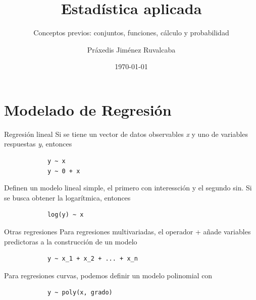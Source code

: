 \documentclass[aspectratio=169,xcolor=dvipsnames]{beamer}
\title{Estadística aplicada}
\subtitle{Conceptos previos: conjuntos, funciones, cálculo y probabilidad}
\author{Práxedis Jiménez Ruvalcaba}
\institute
{

}
\date{\today}
\begin{document}
\begin{frame}[c]

    \vspace{1cm}
    \begin{center}
        \insertauthor\par
        \vspace{0.5cm}
        \insertinstitute\par
        \insertdate
    \end{center}
    
\end{frame}

\section{Modelado de Regresión}
    \begin{frame}[fragile]{Regresión lineal}
        Si se tiene un vector de datos observables \textit{x} y uno de variables respuestas \textit{y}, entonces
        \begin{verbatim}
            y ~ x
            y ~ 0 + x
        \end{verbatim}
        Definen un modelo lineal simple, el primero con interessción y el segundo sin. Si se busca 
        obtener la logarítmica, entonces
        \begin{verbatim}
            log(y) ~ x
        \end{verbatim}
    \end{frame}

    \begin{frame}[fragile]{Otras regresiones}
        Para regresiones multivariadas, el operador + añade variables predictoras a la construcción de un modelo
        \begin{verbatim}
            y ~ x_1 + x_2 + ... + x_n
        \end{verbatim}
        Para regresiones curvas, podemos definir un modelo polinomial con
        \begin{verbatim}
            y ~ poly(x, grado)
        \end{verbatim}
    \end{frame}
\end{document}
